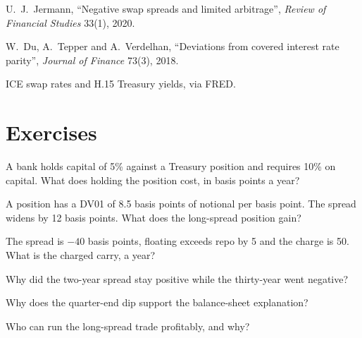 \begin{omsources}
\item U.~J.~Jermann, ``Negative swap spreads and limited arbitrage'', \emph{Review of Financial Studies} 33(1), 2020.
\item W.~Du, A.~Tepper and A.~Verdelhan, ``Deviations from covered interest rate parity'', \emph{Journal of Finance} 73(3), 2018.
\item ICE swap rates and H.15 Treasury yields, via FRED.
\end{omsources}

\section{Exercises}

\begin{exercise}[$\star$]\label{exo:s2:swap-spread-and-asset-swap-trades:1}
A bank holds capital of 5\% against a Treasury position and requires 10\% on capital. What does holding the position cost, in basis points a year?
\end{exercise}

\begin{exercise}[$\star$]\label{exo:s2:swap-spread-and-asset-swap-trades:2}
A position has a DV01 of 8.5 basis points of notional per basis point. The spread widens by 12 basis points. What does the long-spread position gain?
\end{exercise}

\begin{exercise}[$\star$]\label{exo:s2:swap-spread-and-asset-swap-trades:3}
The spread is $-40$ basis points, floating exceeds repo by 5 and the charge is 50. What is the charged carry, a year?
\end{exercise}

\begin{exercise}[$\star\star$]\label{exo:s2:swap-spread-and-asset-swap-trades:4}
Why did the two-year spread stay positive while the thirty-year went negative?
\end{exercise}

\begin{exercise}[$\star\star$]\label{exo:s2:swap-spread-and-asset-swap-trades:5}
Why does the quarter-end dip support the balance-sheet explanation?
\end{exercise}

\begin{exercise}[$\star\star$]\label{exo:s2:swap-spread-and-asset-swap-trades:6}
Who can run the long-spread trade profitably, and why?
\end{exercise}

